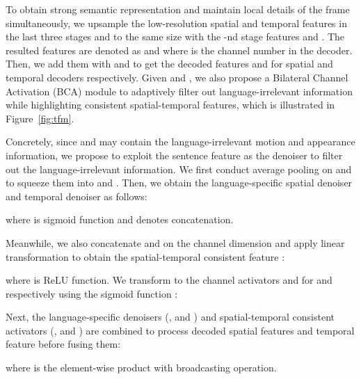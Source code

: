 \documentclass[10pt,twocolumn,letterpaper]{article}
\begin{document}
To obtain strong semantic representation and maintain local details of the frame simultaneously, we upsample the low-resolution spatial and temporal features in the last three stages  and  to the same size with the -nd stage features  and .
The resulted features are denoted as  and  where  is the channel number in the decoder.
Then, we add them with  and  to get the decoded features  and  for spatial and temporal decoders respectively.
Given  and , we also propose a Bilateral Channel Activation (BCA) module to adaptively filter out language-irrelevant information while highlighting consistent spatial-temporal features, which is illustrated in Figure~\ref{fig:tfm}.

Concretely, since  and  may contain the language-irrelevant motion and appearance information, we propose to exploit the sentence feature  as the denoiser to filter out the language-irrelevant information.
We first conduct average pooling on  and  to squeeze them into  and . Then, we obtain the language-specific spatial denoiser  and temporal denoiser  as follows:

where  is sigmoid function and  denotes concatenation.

Meanwhile, we also concatenate  and  on the channel dimension and apply linear transformation to obtain the spatial-temporal consistent feature : 

where  is ReLU \cite{nair2010rectified} function. We transform  to the channel activators  and  for  and  respectively using the sigmoid function :


Next, the language-specific denoisers (\ie,  and ) and spatial-temporal consistent activators (\ie,  and ) are combined to process decoded spatial features  and temporal feature  before fusing them:

where  is the element-wise product with broadcasting operation.
\end{document}
